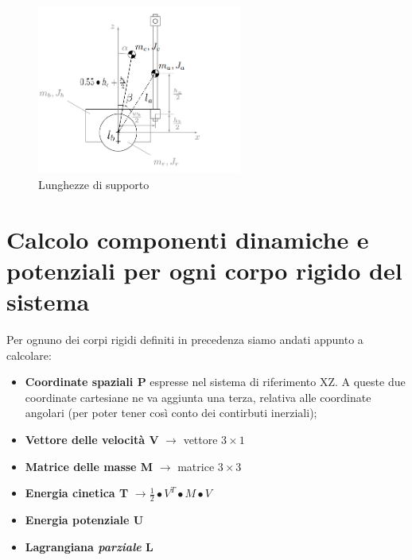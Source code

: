 \begin{figure}[h]
	\centering   	
	\includegraphics[width=0.6\textwidth]{Immagini/VAB_additionalMeasures.png}
	\caption{Lunghezze di supporto}
	\label{fig:VAB_lunghezze}
\end{figure}

\section{Calcolo componenti dinamiche e potenziali per ogni corpo rigido del sistema}
Per ognuno dei corpi rigidi definiti in precedenza siamo andati appunto a calcolare:

\begin{itemize}
	\item \textbf{Coordinate spaziali P} espresse nel sistema di riferimento XZ. A queste due coordinate cartesiane ne va aggiunta una terza, relativa alle coordinate angolari (per poter tener così conto dei contirbuti inerziali);
	\item \textbf{Vettore delle velocità V} $\rightarrow$ vettore $3\times 1$
	\item \textbf{Matrice delle masse M} $\rightarrow$ matrice $3\times 3$
	\item \textbf{Energia cinetica T} $\rightarrow \frac{1}{2}\bullet V^T \bullet M \bullet V$
	\item \textbf{Energia potenziale U}
	\item \textbf{Lagrangiana \textit{parziale} L}
\end{itemize}

